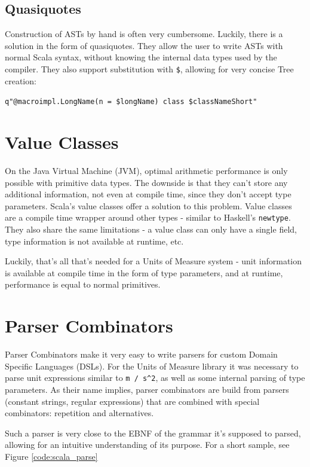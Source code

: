 \documentclass[12pt,oneside,a4paper]{scrbook}
\begin{document}
\subsection{Quasiquotes}

Construction of ASTs by hand is often very cumbersome. Luckily, there is a solution in the form of quasiquotes. They allow the user to write ASTs with normal Scala syntax, without knowing the internal data types used by the compiler. They also support substitution with \verb|$|, allowing for very concise Tree creation:

\verb|q"@macroimpl.LongName(n = $longName) class $classNameShort"|



\section{Value Classes}
\label{sec:value_classes}

On the Java Virtual Machine (JVM), optimal arithmetic performance is only possible with primitive data types. The downside is that they can't store any additional information, not even at compile time, since they don't accept type parameters.
Scala's value classes offer a solution to this problem. Value classes are a compile time wrapper around other types - similar to Haskell's \verb|newtype|. They also share the same limitations - a value class can only have a single field, type information is not available at runtime, etc.

Luckily, that's all that's needed for a Units of Measure system - unit information is available at compile time in the form of type parameters, and at runtime, performance is equal to normal primitives.


\section{Parser Combinators}

Parser Combinators make it very easy to write parsers for custom Domain Specific Languages (DSLs). For the Units of Measure library it was necessary to parse unit expressions similar to \verb|m / s^2|, as well as some internal parsing of type parameters. As their name implies, parser combinators are build from parsers (constant strings, regular expressions) that are combined with special combinators: repetition and alternatives. \citep{Spiewak09}

Such a parser is very close to the EBNF of the grammar it's supposed to parsed, allowing for an intuitive understanding of its purpose. For a short sample, see Figure \ref{code:scala_parse}
\end{document}
